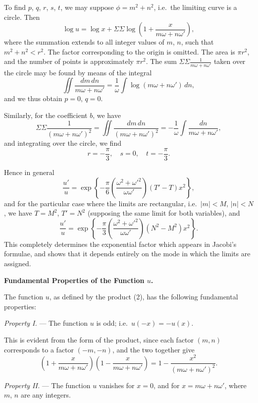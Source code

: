 \documentclass[11pt,a4paper]{book}
\begin{document}
\newpage
\setcounter{page}{140}

To find $p$, $q$, $r$, $s$, $t$, we may suppose $\phi = m^2 + n^2$, i.e.\ the limiting curve is a circle.
Then
\[
\log u = \log x + \Sigma \Sigma \log\left(1 + \frac{x}{m\omega + n\omega'}\right),
\]
where the summation extends to all integer values of $m$, $n$, such that $m^2 + n^2 < r^2$.
The factor corresponding to the origin is omitted. The area is $\pi r^2$, and the number
of points is approximately $\pi r^2$. The sum $\Sigma \Sigma \frac{1}{m\omega + n\omega'}$ taken over the circle may
be found by means of the integral
\[
\iint \frac{dm\,dn}{m\omega + n\omega'} = \frac{1}{\omega} \int \log(m\omega + n\omega')\,dn,
\]
and we thus obtain $p = 0$, $q = 0$.

Similarly, for the coefficient $b$, we have
\[
\Sigma \Sigma \frac{1}{(m\omega + n\omega')^2} = \iint \frac{dm\,dn}{(m\omega + n\omega')^2} = -\frac{1}{\omega} \int \frac{dn}{m\omega + n\omega'},
\]
and integrating over the circle, we find
\[
r = -\frac{\pi}{3},\quad s = 0,\quad t = -\frac{\pi}{3}.
\]

\newpage
\setcounter{page}{141}

Hence in general
\[
\frac{u'}{u} = \exp\left\{-\frac{\pi}{6}\left(\frac{\omega^2 + \omega'^2}{\omega\omega'}\right)(T' - T)x^2\right\},
\]
and for the particular case where the limits are rectangular, i.e.\ $|m| < M$, $|n| < N$,
we have $T = M^2$, $T' = N^2$ (supposing the same limit for both variables), and
\[
\frac{u'}{u} = \exp\left\{-\frac{\pi}{3}\left(\frac{\omega^2 + \omega'^2}{\omega\omega'}\right)(N^2 - M^2)x^2\right\}.
\]
This completely determines the exponential factor which appears in Jacobi's formulae,
and shows that it depends entirely on the mode in which the limits are assigned.

\medskip

\textbf{Fundamental Properties of the Function $u$.}

The function $u$, as defined by the product (2), has the following fundamental
properties:

\medskip
\textit{Property I.} --- The function $u$ is odd; i.e.\ $u(-x) = -u(x)$.

This is evident from the form of the product, since each factor $(m, n)$ corresponds
to a factor $(-m, -n)$, and the two together give
\[
\left(1 + \frac{x}{m\omega + n\omega'}\right)\left(1 - \frac{x}{m\omega + n\omega'}\right) = 1 - \frac{x^2}{(m\omega + n\omega')^2}.
\]

\medskip
\textit{Property II.} --- The function $u$ vanishes for $x = 0$, and for $x = m\omega + n\omega'$,
where $m$, $n$ are any integers.
\end{document}
